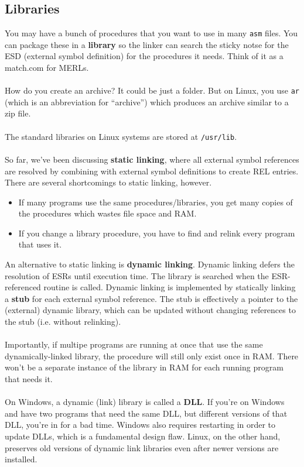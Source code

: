 \documentclass[]{article}
\theoremstyle{definition}
\begin{document}
			\subsection{Libraries}
				You may have a bunch of procedures that you want to use in many \verb+asm+ files. You can package these in a \textbf{library} so the linker can search the sticky notse for the ESD (external symbol definition) for the procedures it needs. Think of it as a match.com for MERLs.
				\\ \\
				How do you create an archive? It could be just a folder. But on Linux, you use \verb+ar+ (which is an abbreviation for ``archive'') which produces an archive similar to a zip file.
				\\ \\
				The standard libraries on Linux systems are stored at \verb+/usr/lib+.
				\\ \\
				So far, we've been discussing \textbf{static linking}, where all external symbol references are resolved by combining with external symbol definitions to create REL entries. There are several shortcomings to static linking, however.
				\begin{itemize}
					\item If many programs use the same procedures/libraries, you get many copies of the procedures which wastes file space and RAM.
					\item If you change a library procedure, you have to find and relink every program that uses it.
				\end{itemize}
				An alternative to static linking is \textbf{dynamic linking}. Dynamic linking defers the resolution of ESRs until execution time. The library is searched when the ESR-referenced routine is called. Dynamic linking is implemented by statically linking a \textbf{stub} for each external symbol reference. The stub is effectively a pointer to the (external) dynamic library, which can be updated without changing references to the stub (i.e. without relinking). 
				\\ \\
				Importantly, if multipe programs are running at once that use the same dynamically-linked library, the procedure will still only exist once in RAM. There won't be a separate instance of the library in RAM for each running program that needs it.
				\\ \\
				On Windows, a dynamic (link) library is called a \textbf{DLL}. If you're on Windows and have two programs that need the same DLL, but different versions of that DLL, you're in for a bad time. Windows also requires restarting in order to update DLLs, which is a fundamental design flaw. Linux, on the other hand, preserves old versions of dynamic link libraries even after newer versions are installed.
\end{document}
